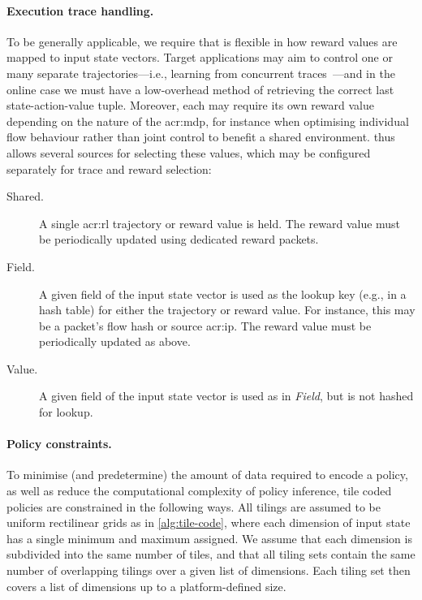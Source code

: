 \paragraph{Execution trace handling.}
To be generally applicable, we require that \approachshort{} is flexible in how reward values are mapped to input state vectors.
Target applications may aim to control one or many separate trajectories---i.e., learning from concurrent traces~\parencite{DBLP:conf/aamas/GroundsK07}---and in the online case we must have a low-overhead method of retrieving the correct last state-action-value tuple.
Moreover, each may require its own reward value depending on the nature of the \gls{acr:mdp}, for instance when optimising individual flow behaviour rather than joint control to benefit a shared environment.
\approachshort{} thus allows several sources for selecting these values, which may be configured separately for trace and reward selection:
\begin{description}
	\item[Shared.] A single \gls{acr:rl} trajectory or reward value is held. The reward value must be periodically updated using dedicated reward packets.
	\item[Field.] A given field of the input state vector is used as the lookup key (e.g., in a hash table) for either the trajectory or reward value. For instance, this may be a packet's flow hash or source \gls{acr:ip}. The reward value must be periodically updated as above.
	\item[Value.] A given field of the input state vector is used as in \emph{Field}, but is not hashed for lookup.
\end{description}

\paragraph{Policy constraints.}
To minimise (and predetermine) the amount of data required to encode a policy, as well as reduce the computational complexity of policy inference, tile coded policies are constrained in the following ways.
All tilings are assumed to be uniform rectilinear grids as in \cref{alg:tile-code}, where each dimension of input state has a single minimum and maximum assigned.
We assume that each dimension is subdivided into the same number of tiles, and that all tiling sets contain the same number of overlapping tilings over a given list of dimensions.
Each tiling set then covers a list of dimensions up to a platform-defined size.

